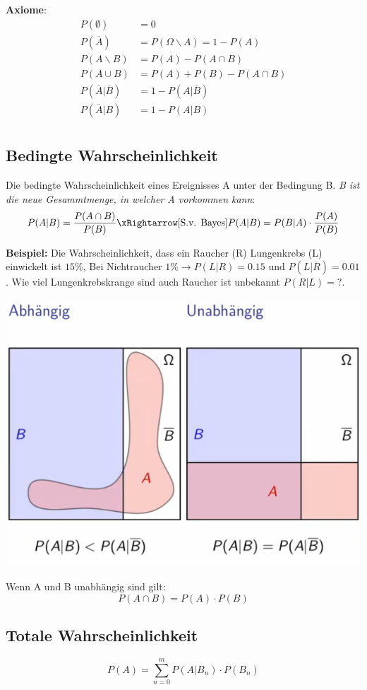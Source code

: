 \textbf{Axiome}:\\
\begin{align*}
	P(\emptyset) &= 0 \\
	P(\overline{A}) &= P(\Omega \backslash A) = 1 - P(A) \\
	P(A \backslash B) &= P(A) - P(A \cap B) \\
	P(A \cup B) &= P(A)  + P(B) - P(A \cap B) \\
	P(\overline{A} | \overline{B}) &= 1-P(A|\overline{B}) \\
	P(\overline{A} | B) &= 1-P(A|B) \\
\end{align*}

\subsection{Bedingte Wahrscheinlichkeit}
Die bedingte Wahrscheinlichkeit eines Ereignisses A unter der Bedingung B. \textit{B ist die neue Gesammtmenge, in welcher A vorkommen kann}:
\[
P(A|B) = \frac{P(A \cap B)}{P(B)} \xRightarrow[\text{S.v. Bayes}]{} P(A|B) = P(B|A)\cdot\frac{P(A)}{P(B)}
\]

\noindent\textbf{Beispiel:} Die Wahrscheinlichkeit, dass ein Raucher (R) Lungenkrebs (L) einwickelt ist $15\%$, Bei Nichtraucher $1\% \rightarrow P(L|R) = 0.15$ und $P(L|\overline{R}) = 0.01$. Wie viel Lungenkrebskrange sind auch Raucher ist unbekannt $P(R|L) = ?$.

\begin{center}
	\includegraphics[width=0.5\columnwidth]{Images/bedingte_wahr.}
\end{center}

\noindent Wenn A und B unabhängig sind gilt:
\[ P(A \cap B) = P(A) \cdot P(B)\]


\subsection{Totale Wahrscheinlichkeit}
\[
P(A) = \sum_{n=0}^{m}P(A|B_n)\cdot P(B_n)
\]

